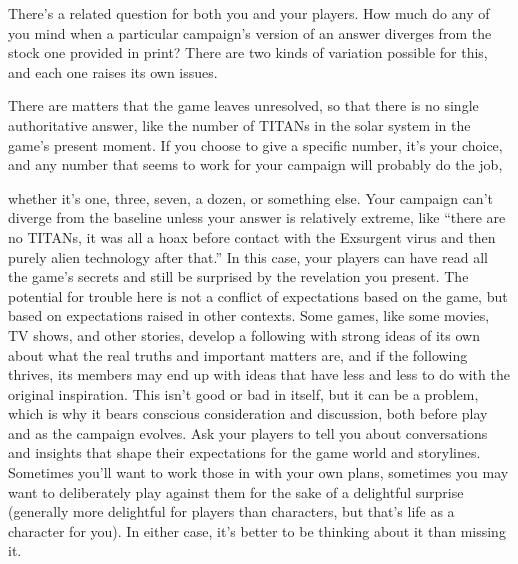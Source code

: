 There's a related question for both you and your players. How much do any of you mind when a particular campaign's version of an answer diverges from the stock one provided in print? There are two kinds of variation possible for this, and each one raises its own issues. 

There are matters that the game leaves unresolved, so that there is no single authoritative answer, like the number of TITANs in the solar system in the game's present moment. If you choose to give a specific number, it's your choice, and any number that seems to work for your campaign will probably do the job, 

whether it's one, three, seven, a dozen, or something else. Your campaign can't diverge from the baseline unless your answer is relatively extreme, like ``there are no TITANs, it was all a hoax before contact with the Exsurgent virus and then purely alien technology after that.'' In this case, your players can have read all the game's secrets and still be surprised by the revelation you present. The potential for trouble here is not a conflict of expectations based on the game, but based on expectations raised in other contexts. Some games, like some movies, TV shows, and other stories, develop a following with strong ideas of its own about what the real truths and important matters are, and if the following thrives, its members may end up with ideas that have less and less to do with the original inspiration. This isn't good or bad in itself, but it can be a problem, which is why it bears conscious consideration and discussion, both before play and as the campaign evolves. Ask your players to tell you about conversations and insights that shape their expectations for the game world and storylines. Sometimes you'll want to work those in with your own plans, sometimes you may want to deliberately play against them for the sake of a delightful surprise (generally more delightful for players than characters, but that's life as a character for you). In either case, it's better to be thinking about it than missing it. 

